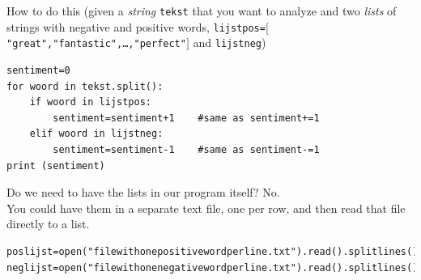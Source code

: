 \documentclass{beamer}
\begin{document}
\begin{frame}[fragile]{How to do this}
\scriptsize{ 
	(given a \emph{string} \texttt{tekst} that you want to analyze and two 
	\emph{lists} of strings with negative and positive words, 
	\texttt{lijstpos=$[$"great","fantastic",\ldots,"perfect"$]$} and \texttt{lijstneg})\\
}

\begin{lstlisting}
sentiment=0
for woord in tekst.split():
    if woord in lijstpos:
        sentiment=sentiment+1    #same as sentiment+=1
    elif woord in lijstneg:
        sentiment=sentiment-1    #same as sentiment-=1
print (sentiment)
\end{lstlisting}
\end{frame}


\begin{frame}[fragile]{Do we need to have the lists in our program itself?}
No.\\
You could have them in a separate text file, one per row, and then read that file directly to a list.\\
\begin{lstlisting}
poslijst=open("filewithonepositivewordperline.txt").read().splitlines()
neglijst=open("filewithonenegativewordperline.txt").read().splitlines()
\end{lstlisting}
\end{frame}


{
	\begin{frame}[plain]
	\end{frame}
}
\end{document}
